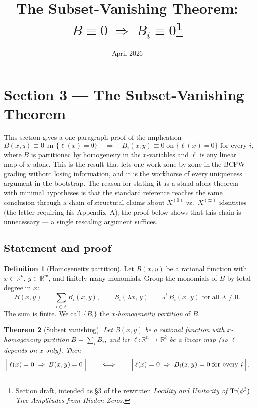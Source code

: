 \documentclass[11pt]{article}
\title{The Subset-Vanishing Theorem: $B \equiv 0 \;\Rightarrow\; B_i \equiv 0$\thanks{Section draft, intended as \S3 of the rewritten \emph{Locality and Unitarity of $\mathrm{Tr}(\phi^3)$ Tree Amplitudes from Hidden Zeros}.}}
\date{April 2026}
\newtheorem{theorem}{Theorem}
\theoremstyle{definition}
\newtheorem{definition}[theorem]{Definition}
\newcommand{\R}{\mathbb{R}}
\newcommand{\Z}{\mathbb{Z}}
\begin{document}
\maketitle

\setcounter{section}{3}
\renewcommand{\thesection}{\arabic{section}}
\renewcommand{\thesubsection}{\thesection.\arabic{subsection}}

\section*{Section 3 --- The Subset-Vanishing Theorem}

\noindent
This section gives a one-paragraph proof of the implication
\[
B(x,y) \equiv 0 \text{ on } \{\ell(x) = 0\} \quad\Longrightarrow\quad B_i(x,y) \equiv 0 \text{ on } \{\ell(x) = 0\} \text{ for every } i,
\]
where $B$ is partitioned by homogeneity in the $x$-variables and $\ell$ is any linear map of $x$ alone. This is the result that lets one work zone-by-zone in the BCFW grading without losing information, and it is the workhorse of every uniqueness argument in the bootstrap. The reason for stating it as a stand-alone theorem with minimal hypotheses is that the standard reference \cite[eqs.~(15)--(18)]{Rodina} reaches the same conclusion through a chain of structural claims about $X^{(0)}$ vs.\ $X^{(\infty)}$ identities (the latter requiring his Appendix~A); the proof below shows that this chain is unnecessary --- a single rescaling argument suffices.

\subsection{Statement and proof}

\begin{definition}[Homogeneity partition]
Let $B(x,y)$ be a rational function with $x \in \R^n$, $y \in \R^m$, and finitely many monomials. Group the monomials of $B$ by total degree in $x$:
\[
B(x,y) \;=\; \sum_{i \in \Z} B_i(x,y), \qquad B_i(\lambda x,\, y) \;=\; \lambda^i \, B_i(x,\, y) \text{ for all } \lambda \neq 0.
\]
The sum is finite. We call $\{B_i\}$ the \emph{$x$-homogeneity partition} of $B$.
\end{definition}

\begin{theorem}[Subset vanishing]\label{thm:subset}
Let $B(x,y)$ be a rational function with $x$-homogeneity partition $B = \sum_i B_i$, and let $\ell : \R^n \to \R^k$ be a linear map (so $\ell$ depends on $x$ only). Then
\[
\Bigl[\, \ell(x) = 0 \;\Rightarrow\; B(x,y) = 0 \,\Bigr]
\qquad\Longleftrightarrow\qquad
\Bigl[\, \ell(x) = 0 \;\Rightarrow\; B_i(x,y) = 0 \text{ for every } i\, \Bigr].
\]
\end{theorem}
\end{document}
